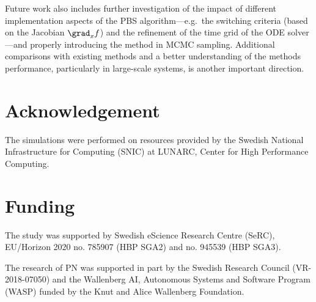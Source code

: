 \documentclass[DIV=12]{scrartcl} %
\theoremstyle{definition}
\begin{document}
Future work also includes further investigation of the impact of different implementation aspects of the PBS algorithm—e.g.\ the switching criteria (based on the Jacobian $\grad _x f$) and the refinement of the time grid of the ODE solver—and properly introducing the method in MCMC sampling. Additional comparisons with existing methods and a better understanding of the methods performance, particularly in large-scale systems, is another important direction.   
\section*{Acknowledgement}
 The simulations were performed on resources provided by the Swedish National Infrastructure for Computing (SNIC) at LUNARC, Center for High Performance Computing.

\section*{Funding}
The study was supported by Swedish eScience Research Centre (SeRC), EU/Horizon 2020 no. 785907 (HBP SGA2) and no. 945539 (HBP SGA3).

The research of PN was supported in part by the Swedish Research Council (VR-2018-07050) and the Wallenberg AI, Autonomous Systems and Software Program (WASP) funded by the Knut and Alice Wallenberg Foundation.


\printbibliography
\end{document}
